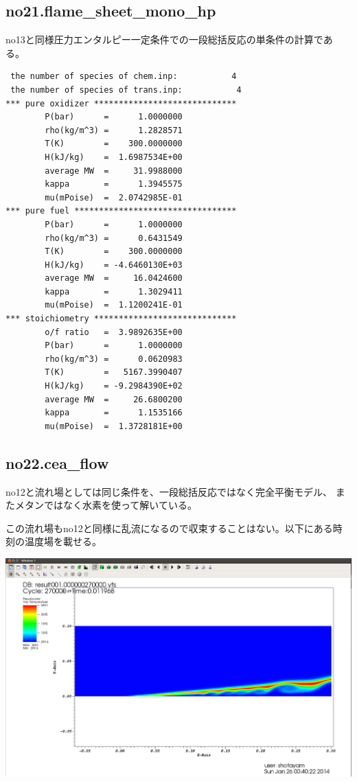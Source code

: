 \documentclass{jsarticle}
\begin{document}
\subsection{no21.flame\_sheet\_mono\_hp}%
no13と同様圧力エンタルピー一定条件での一段総括反応の単条件の計算である。
\begin{verbatim}
 the number of species of chem.inp:           4
 the number of species of trans.inp:           4
*** pure oxidizer *****************************
        P(bar)      =      1.0000000
        rho(kg/m^3) =      1.2828571
        T(K)        =    300.0000000
        H(kJ/kg)    =  1.6987534E+00
        average MW  =     31.9988000
        kappa       =      1.3945575
        mu(mPoise)  =  2.0742985E-01
*** pure fuel *********************************
        P(bar)      =      1.0000000
        rho(kg/m^3) =      0.6431549
        T(K)        =    300.0000000
        H(kJ/kg)    = -4.6460130E+03
        average MW  =     16.0424600
        kappa       =      1.3029411
        mu(mPoise)  =  1.1200241E-01
*** stoichiometry *****************************
        o/f ratio   =  3.9892635E+00
        P(bar)      =      1.0000000
        rho(kg/m^3) =      0.0620983
        T(K)        =   5167.3990407
        H(kJ/kg)    = -9.2984390E+02
        average MW  =     26.6800200
        kappa       =      1.1535166
        mu(mPoise)  =  1.3728181E+00
\end{verbatim}
\subsection{no22.cea\_flow}%
no12と流れ場としては同じ条件を、一段総括反応ではなく完全平衡モデル、
またメタンではなく水素を使って解いている。

この流れ場もno12と同様に乱流になるので収束することはない。以下にある時刻の温度場を載せる。
\begin{center}
\includegraphics[width=.9\textwidth,bb=0 0 1667 1053]{sample/no22.png}
\end{center}
\end{document}
